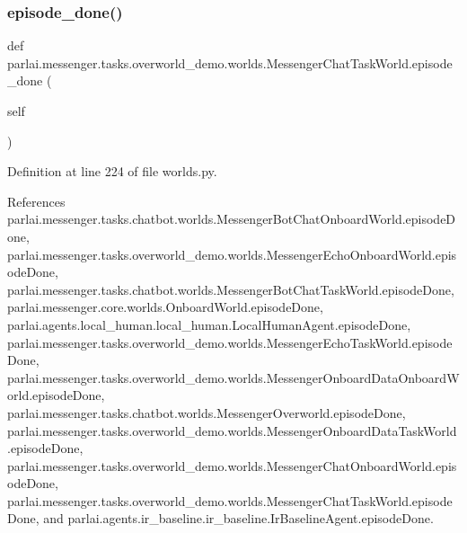 \subsubsection{\texorpdfstring{episode\+\_\+done()}{episode\_done()}}
{\footnotesize\ttfamily def parlai.\+messenger.\+tasks.\+overworld\+\_\+demo.\+worlds.\+Messenger\+Chat\+Task\+World.\+episode\+\_\+done (\begin{DoxyParamCaption}\item[{}]{self }\end{DoxyParamCaption})}



Definition at line 224 of file worlds.\+py.



References parlai.\+messenger.\+tasks.\+chatbot.\+worlds.\+Messenger\+Bot\+Chat\+Onboard\+World.\+episode\+Done, parlai.\+messenger.\+tasks.\+overworld\+\_\+demo.\+worlds.\+Messenger\+Echo\+Onboard\+World.\+episode\+Done, parlai.\+messenger.\+tasks.\+chatbot.\+worlds.\+Messenger\+Bot\+Chat\+Task\+World.\+episode\+Done, parlai.\+messenger.\+core.\+worlds.\+Onboard\+World.\+episode\+Done, parlai.\+agents.\+local\+\_\+human.\+local\+\_\+human.\+Local\+Human\+Agent.\+episode\+Done, parlai.\+messenger.\+tasks.\+overworld\+\_\+demo.\+worlds.\+Messenger\+Echo\+Task\+World.\+episode\+Done, parlai.\+messenger.\+tasks.\+overworld\+\_\+demo.\+worlds.\+Messenger\+Onboard\+Data\+Onboard\+World.\+episode\+Done, parlai.\+messenger.\+tasks.\+chatbot.\+worlds.\+Messenger\+Overworld.\+episode\+Done, parlai.\+messenger.\+tasks.\+overworld\+\_\+demo.\+worlds.\+Messenger\+Onboard\+Data\+Task\+World.\+episode\+Done, parlai.\+messenger.\+tasks.\+overworld\+\_\+demo.\+worlds.\+Messenger\+Chat\+Onboard\+World.\+episode\+Done, parlai.\+messenger.\+tasks.\+overworld\+\_\+demo.\+worlds.\+Messenger\+Chat\+Task\+World.\+episode\+Done, and parlai.\+agents.\+ir\+\_\+baseline.\+ir\+\_\+baseline.\+Ir\+Baseline\+Agent.\+episode\+Done.

\mbox{\label{classparlai_1_1messenger_1_1tasks_1_1overworld__demo_1_1worlds_1_1MessengerChatTaskWorld_adb50954ee0b791a164fbe763de5685d2}} 
